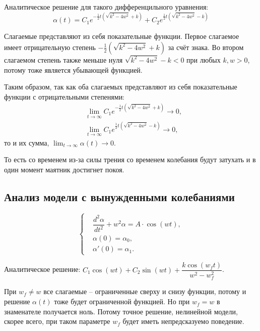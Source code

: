 		Аналитическое решение для такого дифференцильного уравнения:
		\begin{equation*}
			\alpha(t) = C_1 e^{-\frac{1}{2} t \left(\sqrt{k^2 - 4 w^2} + k \right)} + C_2 e^{\frac{1}{2} t \left(\sqrt{k^2 - 4 w^2} - k \right)}
		\end{equation*}

		Слагаемые представляют из себя показательные функции. Первое слагаемое имеет отрицательную степень \( -\frac{1}{2} \left(\sqrt{k^2 - 4 w^2} + k \right) \) за счёт знака.
		Во втором слагаемом степень также меньше нуля \( \sqrt{k^2 - 4 w^2} - k  < 0 \) при любых \( k, w > 0 \), потому тоже является убывающей функцией.

		Таким образом, так как оба слагаемых представляют из себя показательные функции с отрицательными степенями: 
		\begin{align*}
			& \lim_{t \rightarrow \infty} C_1 e^{-\frac{1}{2} t \left(\sqrt{k^2 - 4 w^2} + k \right)} \rightarrow 0, \\
			& \lim_{t \rightarrow \infty} C_1 e^{\frac{1}{2} t \left(\sqrt{k^2 - 4 w^2} - k \right)} \rightarrow 0,
		\end{align*}
		то и их сумма, \( \displaystyle \lim_{t \rightarrow \infty} \alpha(t) \rightarrow  0.\) 

		То есть со временем из-за силы трения со временем колебания будут затухать и в один момент маятник достигнет покоя.

	\subsection{Анализ модели с вынужденными колебаниями}
		\begin{equation}
			\begin{cases}
				& \dfrac{d^2 \alpha}{dt^2} + w^2  \alpha = A \cdot \cos(wt), \\
				& \alpha(0) = \alpha_0, \\
				& \alpha'(0) = \alpha_1.
			\end{cases}
		\end{equation}

		Аналитическое решение: \( C_1 \cos \left( wt \right) + C_2 \sin \left( wt \right) + \dfrac{k \cos \left( w_f t \right)}{w^2 - w_f^2}  \).

		При \( w_f \neq w \) все слагаемые -- ограниченные сверху и снизу функции, потому и решение \( \alpha(t) \) тоже будет ограниченной функцией. Но при \( w_f = w \) в знаменателе получается ноль. Потому точное решение, нелинейной модели, скорее всего, при таком параметре \( w_f \) будет иметь непредсказуемо поведение.

\pagebreak